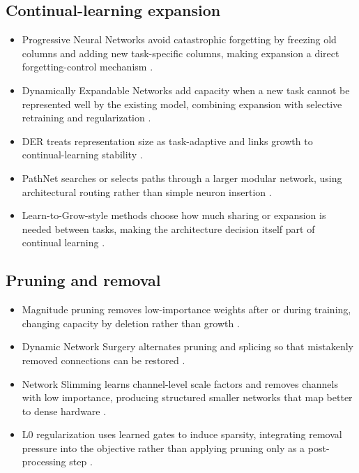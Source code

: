 \subsection{Continual-learning expansion}
\begin{itemize}
  \item Progressive Neural Networks avoid catastrophic forgetting by freezing old columns and adding new task-specific columns, making expansion a direct forgetting-control mechanism \parencite{rusu2016progressive}.
  \item Dynamically Expandable Networks add capacity when a new task cannot be represented well by the existing model, combining expansion with selective retraining and regularization \parencite{yoon2018den}.
  \item DER treats representation size as task-adaptive and links growth to continual-learning stability \parencite{yan2021der}.
  \item PathNet searches or selects paths through a larger modular network, using architectural routing rather than simple neuron insertion \parencite{fernando2017pathnet}.
  \item Learn-to-Grow-style methods choose how much sharing or expansion is needed between tasks, making the architecture decision itself part of continual learning \parencite{li2019learn}.
\end{itemize}

\subsection{Pruning and removal}
\begin{itemize}
  \item Magnitude pruning removes low-importance weights after or during training, changing capacity by deletion rather than growth \parencite{han2015deep}.
  \item Dynamic Network Surgery alternates pruning and splicing so that mistakenly removed connections can be restored \parencite{guo2016dynamic}.
  \item Network Slimming learns channel-level scale factors and removes channels with low importance, producing structured smaller networks that map better to dense hardware \parencite{liu2017network}.
  \item L0 regularization uses learned gates to induce sparsity, integrating removal pressure into the objective rather than applying pruning only as a post-processing step \parencite{louizos2018learning}.
\end{itemize}

